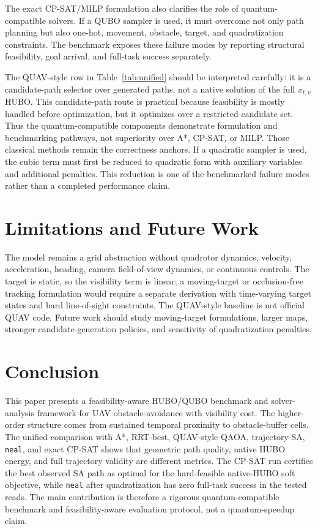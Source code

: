 \documentclass[10pt,conference]{IEEEtran}
\begin{document}
The exact CP-SAT/MILP formulation also clarifies the role of quantum-compatible solvers. If a QUBO sampler is used, it must overcome not only path planning but also one-hot, movement, obstacle, target, and quadratization constraints. The benchmark exposes these failure modes by reporting structural feasibility, goal arrival, and full-task success separately.

The QUAV-style row in Table~\ref{tab:unified} should be interpreted carefully: it is a candidate-path selector over generated paths, not a native solution of the full $x_{t,v}$ HUBO. This candidate-path route is practical because feasibility is mostly handled before optimization, but it optimizes over a restricted candidate set. Thus the quantum-compatible components demonstrate formulation and benchmarking pathways, not superiority over A*, CP-SAT, or MILP. Those classical methods remain the correctness anchors. If a quadratic sampler is used, the cubic term must first be reduced to quadratic form with auxiliary variables and additional penalties. This reduction is one of the benchmarked failure modes rather than a completed performance claim.

\section{Limitations and Future Work}
The model remains a grid abstraction without quadrotor dynamics, velocity, acceleration, heading, camera field-of-view dynamics, or continuous controls. The target is static, so the visibility term is linear; a moving-target or occlusion-free tracking formulation would require a separate derivation with time-varying target states and hard line-of-sight constraints. The QUAV-style baseline is not official QUAV code. Future work should study moving-target formulations, larger maps, stronger candidate-generation policies, and sensitivity of quadratization penalties.

\section{Conclusion}
This paper presents a feasibility-aware HUBO/QUBO benchmark and solver-analysis framework for UAV obstacle-avoidance with visibility cost. The higher-order structure comes from sustained temporal proximity to obstacle-buffer cells. The unified comparison with A*, RRT-best, QUAV-style QAOA, trajectory-SA, \texttt{neal}, and exact CP-SAT shows that geometric path quality, native HUBO energy, and full trajectory validity are different metrics. The CP-SAT run certifies the best observed SA path as optimal for the hard-feasible native-HUBO soft objective, while \texttt{neal} after quadratization has zero full-task success in the tested reads. The main contribution is therefore a rigorous quantum-compatible benchmark and feasibility-aware evaluation protocol, not a quantum-speedup claim.
\end{document}
